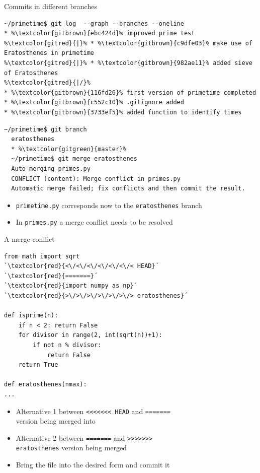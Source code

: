 \documentclass[svgnames]{beamer}
\begin{document}
\begin{frame}[fragile]{Commits in different branches}
 \addtolength\linewidth{0.5truecm}
 \begin{lstlisting}[escapechar=\%]
~/primetime$ git log  --graph --branches --oneline
* %\textcolor{gitbrown}{ebc424d}% improved prime test
%\textcolor{gitred}{|}% * %\textcolor{gitbrown}{c9dfe03}% make use of Eratosthenes in primetime
%\textcolor{gitred}{|}% * %\textcolor{gitbrown}{982ae11}% added sieve of Eratosthenes
%\textcolor{gitred}{|/}%  
* %\textcolor{gitbrown}{116fd26}% first version of primetime completed
* %\textcolor{gitbrown}{c552c10}% .gitignore added
* %\textcolor{gitbrown}{3733ef5}% added function to identify times
 \end{lstlisting}

 \vspace{0.2truecm}
 \begin{lstlisting}[escapechar=\%]
~/primetime$ git branch
  eratosthenes
  * %\textcolor{gitgreen}{master}%
  ~/primetime$ git merge eratosthenes
  Auto-merging primes.py
  CONFLICT (content): Merge conflict in primes.py
  Automatic merge failed; fix conflicts and then commit the result.
 \end{lstlisting}
 \begin{itemize}
  \item \texttt{primetime.py} corresponds now to the \texttt{eratosthenes} branch
  \item In \texttt{primes.py} a merge conflict needs to be resolved
 \end{itemize}
\end{frame}

\begin{frame}[fragile]{A merge conflict}
 \begin{lstlisting}[escapeinside=`´]
from math import sqrt
`\textcolor{red}{<\/<\/<\/<\/<\/<\/< HEAD}´
`\textcolor{red}{=======}´
`\textcolor{red}{import numpy as np}´
`\textcolor{red}{>\/>\/>\/>\/>\/>\/> eratosthenes}´

def isprime(n):
    if n < 2: return False
    for divisor in range(2, int(sqrt(n))+1):
        if not n % divisor:
            return False
    return True

def eratosthenes(nmax):
...
 \end{lstlisting}
 \begin{itemize}
  \item Alternative 1 between \texttt{<\/<\/<\/<\/<\/<\/< HEAD} and \texttt{=======}\\
	version being merged into

  \item Alternative 2 between \texttt{=======} and \texttt{>\/>\/>\/>\/>\/>\/>}\\
	\texttt{eratosthenes} version being merged
  \item Bring the file into the desired form and commit it
 \end{itemize}
\end{frame}
\end{document}
